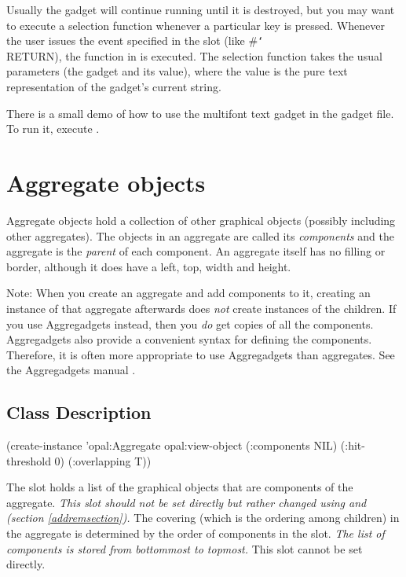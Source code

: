 Usually the gadget will continue running until it is destroyed, but you may
want to execute a selection function whenever a particular key is pressed.
Whenever the user issues the event specified in the  slot
(like \#{\tt\char`\\}RETURN), the function in  is executed.  The
selection function takes the usual parameters (the gadget and its value), where
the value is the pure text representation of the gadget's current string.

There is a small demo of how to use the multifont text gadget in the
gadget file.  To run it, execute {\obeyspaces {}}.



\chapter{Aggregate objects}

\label{aggregates}
Aggregate objects hold a collection of
other graphical objects (possibly including other aggregates).  The objects
in an aggregate are called its {\it components} and the aggregate is the
{\it parent} of each component.  An aggregate itself has no filling or
border, although it does have a left, top, width and height.

Note: When you create an aggregate and add components to it, creating an
instance of that aggregate afterwards does {\it not} create instances of the
children.  If you use Aggregadgets instead, then you {\it do} get copies
of all the components.  Aggregadgets also provide a convenient syntax for
defining the components.  Therefore, it is often more appropriate to use
Aggregadgets than aggregates.  See the Aggregadgets manual
\cite{AggregadgetsManual}.

\section{Class Description}
\label{agg-class}
\begin{programexample}


(create-instance 'opal:Aggregate opal:view-object
  (:components NIL)
  (:hit-threshold 0)
  (:overlapping T))
\end{programexample}

The  slot holds a list of the graphical objects that are
components of the aggregate.  {\it This slot should
not be set directly but rather changed using  and
 (section \ref{addremsection}).}
The covering (which is the ordering among children) in the
aggregate is determined by the order of components in the 
slot.  {\it The list of components is stored from bottommost to topmost.}  This
slot cannot be set directly.

